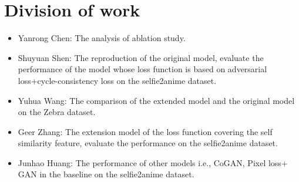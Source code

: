 \section{Division of work}
\begin{itemize}
    \item Yanrong Chen: The analysis of ablation study.
    \item Shuyuan Shen: The reproduction of the original model, evaluate the performance of the model whose loss function is based on adversarial loss+cycle-consistency loss on the selfie2anime dataset.
    \item Yuhua Wang: The comparison of the extended model and the original model on the Zebra dataset.
    \item Geer Zhang: The extension model of the loss function covering the self similarity feature, evaluate the performance on the selfie2anime dataset.
    \item Junhao Huang: The performance of other models i.e., CoGAN, Pixel loss+ GAN in the baseline on the selfie2anime dataset.
\end{itemize}
